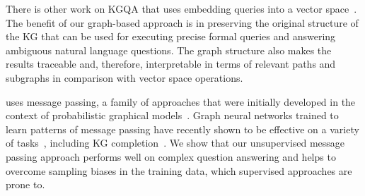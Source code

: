 There is other work on KGQA that uses embedding queries into a vector space~\cite{DBLP:conf/nips/HamiltonBZJL18,DBLP:conf/semweb/WangWLCZQ18}.
The benefit of our graph-based approach is in preserving the original structure of the KG that can be used for executing precise formal queries and answering ambiguous natural language questions.
The graph structure also makes the results traceable and, therefore, interpretable in terms of relevant paths and subgraphs in comparison with vector space operations.

\OurApproach{} uses message passing, a family of approaches that were initially developed in the context of probabilistic graphical models~\cite{pearl1988probabilistic,koller2009probabilistic}.
Graph neural networks trained to learn patterns of message passing have recently shown to be effective on a variety of tasks~\cite{DBLP:conf/icml/GilmerSRVD17,DBLP:journals/corr/abs-1806-01261}, including KG completion~\cite{DBLP:conf/esws/SchlichtkrullKB18}.
We show that our unsupervised message passing approach performs well on complex question answering and helps to overcome sampling biases in the training data, which supervised approaches are prone to.
